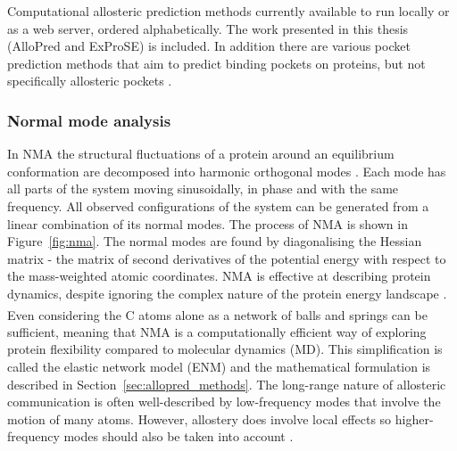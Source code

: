 \begin{table}
\caption[Computational allosteric prediction methods currently available to run locally or as a web server]
{Computational allosteric prediction methods currently available to run locally or as a web server, ordered alphabetically.
The work presented in this thesis (AlloPred and ExProSE) is included.
In addition there are various pocket prediction methods that aim to predict binding pockets on proteins, but not specifically allosteric pockets \cite{Huang2006, LeGuilloux2009, Cimermancic2016}.}

\label{tab:allosteric_methods}
\end{table}


\subsubsection{Normal mode analysis}

In NMA the structural fluctuations of a protein around an equilibrium conformation are decomposed into harmonic orthogonal modes \cite{Hayward2008}.
Each mode has all parts of the system moving sinusoidally, in phase and with the same frequency.
All observed configurations of the system can be generated from a linear combination of its normal modes.
The process of NMA is shown in Figure~\ref{fig:nma}.
The normal modes are found by diagonalising the Hessian matrix - the matrix of second derivatives of the potential energy with respect to the mass-weighted atomic coordinates.
NMA is effective at describing protein dynamics, despite ignoring the complex nature of the protein energy landscape \cite{Bahar2005}.
Even considering the C\textsuperscript{\textalpha} atoms alone as a network of balls and springs can be sufficient, meaning that NMA is a computationally efficient way of exploring protein flexibility compared to molecular dynamics (MD).
This simplification is called the elastic network model (ENM) and the mathematical formulation is described in Section~\ref{sec:allopred_methods}.
The long-range nature of allosteric communication is often well-described by low-frequency modes that involve the motion of many atoms.
However, allostery does involve local effects so higher-frequency modes should also be taken into account \cite{Collier2013}.

